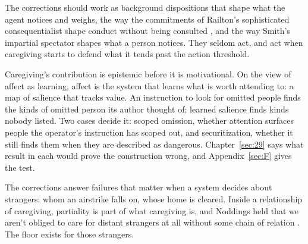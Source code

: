 The corrections should work as background dispositions that shape what the agent notices and weighs, the way the commitments of Railton's sophisticated consequentialist shape conduct without being consulted \autocite{railton1984alienation}, and the way Smith's impartial spectator shapes what a person notices. They seldom act, and act when caregiving starts to defend what it tends past the action threshold.

Caregiving's contribution is epistemic before it is motivational. On the view of affect as learning, affect is the system that learns what is worth attending to: a map of salience that tracks value. An instruction to look for omitted people finds the kinds of omitted person its author thought of; learned salience finds kinds nobody listed. Two cases decide it: scoped omission, whether attention surfaces people the operator's instruction has scoped out, and securitization, whether it still finds them when they are described as dangerous. Chapter~\ref{sec:29} says what result in each would prove the construction wrong, and Appendix~\ref{sec:F} gives the test.

The corrections answer failures that matter when a system decides about strangers: whom an airstrike falls on, whose home is cleared. Inside a relationship of caregiving, partiality is part of what caregiving is, and Noddings held that we aren't obliged to care for distant strangers at all without some chain of relation \autocite{noddings1984caring}. The floor exists for those strangers.
